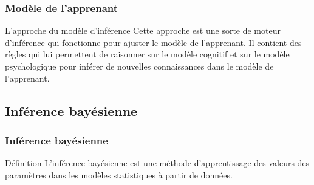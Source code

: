 \documentclass[aspectratio=169,professionalfonts, 12pt]{beamer}
\begin{document}

\begin{frame}
  \frametitle{Modèle de l’apprenant}
  \justifying 
  \begin{minipage}{\textwidth}
  \begin{block}{L’approche du modèle d’inférence}
    Cette approche est une sorte de moteur d’inférence qui fonctionne pour ajuster le modèle de l’apprenant. Il contient des règles qui lui permettent de raisonner sur le modèle cognitif et sur le modèle psychologique pour inférer de nouvelles connaissances dans le modèle de l’apprenant.  
  \end{block}
  \end{minipage} 
\end{frame}

\subsection{Inférence bayésienne}

\begin{frame}
  \frametitle{Inférence bayésienne}
  \justifying 
  \begin{minipage}{\textwidth}
  \begin{block}{Définition}
    L’inférence bayésienne est une méthode d’apprentissage des valeurs des paramètres dans les modèles statistiques à partir de données. 
  \end{block}
  \end{minipage} 
\end{frame}
\end{document}
